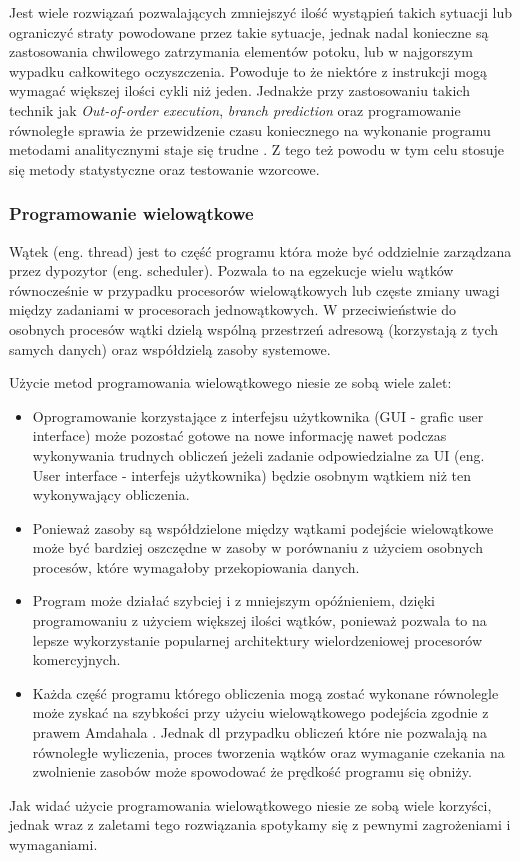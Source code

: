 \documentclass[a4paper,12pt]{article}
\begin{document}
Jest wiele rozwiązań pozwalających zmniejszyć ilość wystąpień takich sytuacji lub ograniczyć straty powodowane przez takie sytuacje, jednak nadal konieczne są zastosowania chwilowego zatrzymania elementów potoku, lub w najgorszym wypadku całkowitego oczyszczenia.
Powoduje to że niektóre z instrukcji mogą wymagać większej ilości cykli niż jeden. Jednakże przy zastosowaniu takich technik jak
\textit{Out-of-order execution}, \textit{branch prediction} oraz programowanie równoległe  sprawia że przewidzenie czasu koniecznego na wykonanie programu metodami analitycznymi staje się trudne . 
Z tego też powodu w tym celu stosuje się metody statystyczne oraz testowanie wzorcowe. 

\subsubsection{Programowanie wielowątkowe}

Wątek (eng. thread) jest to część programu która może być oddzielnie zarządzana przez dypozytor (eng. scheduler). 
Pozwala to na egzekucje wielu wątków równocześnie w przypadku procesorów wielowątkowych lub częste zmiany uwagi między zadaniami w procesorach jednowątkowych.
W przeciwieństwie do osobnych procesów wątki dzielą wspólną przestrzeń adresową (korzystają z tych samych danych) oraz współdzielą zasoby systemowe.

Użycie metod programowania wielowątkowego niesie ze sobą wiele zalet:
\begin{itemize}
        \item Oprogramowanie korzystające z interfejsu użytkownika (GUI - grafic user interface) może pozostać gotowe na nowe informację nawet podczas wykonywania trudnych obliczeń jeżeli zadanie odpowiedzialne za UI (eng. User interface - interfejs użytkownika) będzie osobnym wątkiem niż ten wykonywający obliczenia.
        \item Ponieważ zasoby są współdzielone między wątkami podejście wielowątkowe może być bardziej oszczędne w zasoby w porównaniu z użyciem osobnych procesów, które wymagałoby przekopiowania danych.
        \item Program może działać szybciej i z mniejszym opóźnieniem, dzięki programowaniu z użyciem większej ilości wątków, ponieważ pozwala to na lepsze wykorzystanie popularnej architektury wielordzeniowej procesorów komercyjnych. 
        \item Każda część programu którego obliczenia mogą zostać wykonane równolegle może zyskać na szybkości przy użyciu wielowątkowego podejścia zgodnie z prawem Amdahala \cite{arch}. 
        Jednak dl przypadku obliczeń które nie pozwalają na równoległe wyliczenia, proces tworzenia wątków oraz wymaganie czekania na zwolnienie zasobów może spowodować że prędkość programu się obniży.
\end{itemize}
Jak widać użycie programowania wielowątkowego niesie ze sobą wiele korzyści,
jednak wraz z zaletami tego rozwiązania spotykamy się z pewnymi zagrożeniami i wymaganiami.
\end{document}
